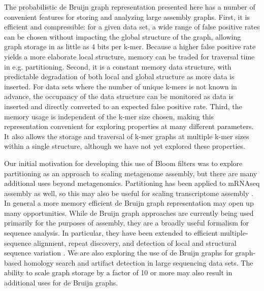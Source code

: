 \documentclass{pnastwo}
\begin{document}
\begin{article}
The probabilistic de Bruijn graph representation presented here has a
number of convenient features for storing and analyzing large assembly
graphs.  First, it is efficient and compressible: for a given data
set, a wide range of false positive rates can be chosen without
impacting the global structure of the graph, allowing graph storage in
as little as 4 bits per k-mer.  Because a higher false positive rate
yields a more elaborate local structure, memory can be traded for
traversal time in e.g. partitioning.  Second, it is a constant memory
data structure, with predictable degradation of both local and global
structure as more data is inserted.  For data sets where the number of
unique k-mers is not known in advance, the occupancy of the data
structure can be monitored as data is inserted and directly converted
to an expected false positive rate.  Third, the memory usage is
independent of the k-mer size chosen, making this representation
convenient for exploring properties at many different parameters.  It
also allows the storage and traversal of k-mer graphs at multiple
k-mer sizes within a single structure, although we have not yet
explored these properties.

Our initial motivation for developing this use of Bloom filters was to
explore partitioning as an approach to scaling metagenome assembly,
but there are many additional uses beyond metagenomics.  Partitioning
has been applied to mRNAseq assembly as well, so this may also be
useful for scaling transcriptome assembly \cite{trinity}.  In general
a more memory efficient de Bruijn graph representation may open up
many opportunities.  While de Bruijn graph approaches are currently
being used primarily for the purposes of assembly, they are a broadly
useful formalism for sequence analysis. In particular, they have been
extended to efficient multiple-sequence alignment\cite{zhang2003dna},
repeat discovery\cite{price2005novo}, and detection of local and
structural sequence variation \cite{zerbinothesis}.  We are also
exploring the use of de Bruijn graphs for graph-based homology search
and artifact detection in large sequencing data sets.  The ability to
scale graph storage by a factor of 10 or more may also result in
additional uses for de Bruijn graphs.



\end{article}
\end{document}
